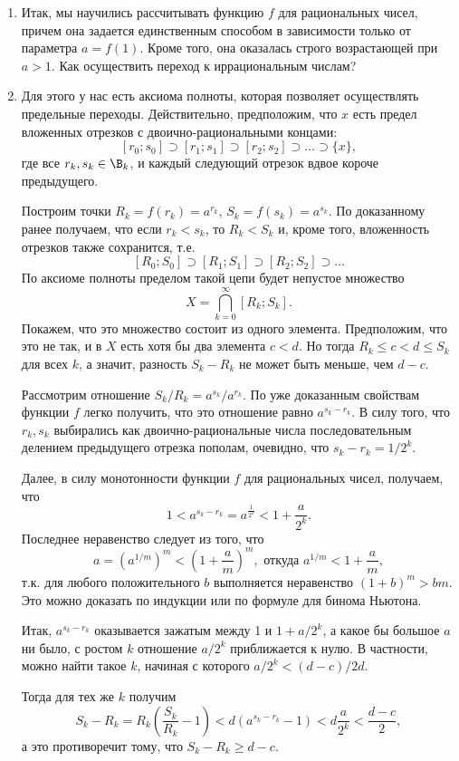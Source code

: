 \begin{enumerate}
\item Итак, мы научились рассчитывать функцию $f$ для рациональных чисел, причем она задается единственным способом в зависимости только от параметра $a=f(1)$. Кроме того, она оказалась строго возрастающей при $a>1$. Как осуществить переход к иррациональным числам?

\item Для этого у нас есть аксиома полноты, которая позволяет осуществлять предельные переходы. Действительно, предположим, что $x$ есть предел вложенных отрезков с двоично-рациональными концами:
$$
[r_0;s_0]\supset [r_1;s_1]\supset [r_2;s_2]\supset \dots \supset\{x\},
$$
где все $r_k,s_k\in\B_k$, и каждый следующий отрезок вдвое короче предыдущего.

Построим точки $R_k=f(r_k)=a^{r_k}$, $S_k=f(s_k)=a^{s_k}$. По доказанному ранее получаем, что если $r_k<s_k$, то $R_k<S_k$ и, кроме того, вложенность отрезков также сохранится, т.е.
$$
[R_0;S_0]\supset [R_1;S_1]\supset [R_2;S_2]\supset \dots
$$
По аксиоме полноты пределом такой цепи будет непустое множество
$$
X=\bigcap_{k=0}^\infty [R_k;S_k].
$$
Покажем, что это множество состоит из одного элемента. Предположим, что это не так, и в $X$ есть хотя бы два элемента $c<d$. Но тогда $R_k\le c<d\le S_k$ для всех $k$, а значит, разность $S_k-R_k$ не может быть меньше, чем $d-c$.


Рассмотрим отношение $S_k/R_k=a^{s_k}/a^{r_k}$. По уже доказанным свойствам функции $f$ легко получить, что это отношение равно
$a^{s_k-r_k}$. В силу того, что $r_k,s_k$ выбирались как двоично-рациональные числа последовательным делением предыдущего отрезка пополам, очевидно, что $s_k-r_k=1/2^k$.

Далее, в силу монотонности функции $f$ для рациональных чисел, получаем, что
$$
1<a^{s_k-r_k}=a^{\frac{1}{2^k}}<1+\frac{a}{2^k}.
$$
Последнее неравенство следует из того, что
$$
a=(a^{1/m})^m < \left(1+\frac{a}{m}\right)^m,\mbox{ откуда }a^{1/m}<1+\frac am,
$$
т.к. для любого положительного $b$ выполняется неравенство $(1+b)^m>bm$. Это можно доказать по индукции или по формуле для бинома Ньютона.

Итак, $a^{s_k-r_k}$ оказывается зажатым между 1 и $1+a/2^k$, а какое бы большое $a$ ни было, с ростом $k$ отношение $a/2^k$ приближается к нулю. В частности, можно найти такое $k$, начиная с которого $a/2^k<(d-c)/2d$.

Тогда для тех же $k$ получим
$$
S_k-R_k = R_k\left(\frac{S_k}{R_k}-1\right)<d(a^{s_k-r_k}-1)<d\frac{a}{2^k}<\frac{d-c}2,
$$
а это противоречит тому, что $S_k-R_k\ge d-c$.


\end{enumerate}
